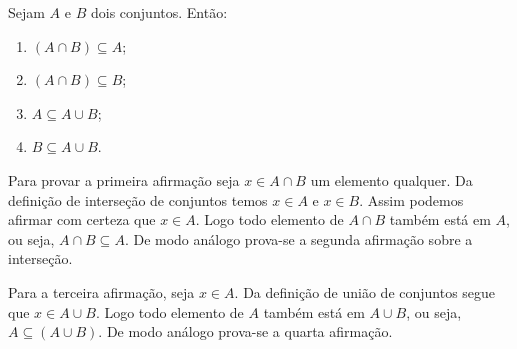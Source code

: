 \documentclass{beamer}
\begin{document}
    \begin{frame}
        \begin{proposicao} Sejam $A$ e $B$ dois conjuntos. \pause Ent{\~a}o:\pause
            \begin{enumerate}[label={\roman*})]
                \item $(A \cap B) \subseteq A$;\pause
                \item $(A \cap B) \subseteq B$;\pause
                \item $A \subseteq A \cup B$;\pause
                \item $B \subseteq A \cup B$.\pause
            \end{enumerate}
        \end{proposicao}
        \begin{prova}
            Para provar a primeira afirma\c{c}\~ao seja $x \in A \cap B$ um elemento qualquer. \pause Da defini\c{c}\~ao de interse\c{c}\~ao de conjuntos \pause temos $x \in A$ e $x \in B$. \pause Assim podemos afirmar com certeza que $x \in A$. \pause Logo todo elemento de $A \cap B$ tamb\'em est\'a em $A$, \pause ou seja, $A \cap B \subseteq A$. \pause De modo an\'alogo prova-se a segunda afirma\c{c}\~ao sobre a interse\c{c}\~ao.\pause

            Para a terceira afirma\c{c}\~ao, seja $x \in A$. \pause Da defini\c{c}\~ao de uni\~ao de conjuntos \pause segue que $x \in A \cup B$. \pause Logo todo elemento de $A$ tamb\'em est\'a em $A \cup B$, \pause ou seja, $A \subseteq (A \cup B)$. \pause De modo an\'alogo prova-se a quarta afirma\c{c}\~ao.\pause
        \end{prova}
    \end{frame}
\end{document}
